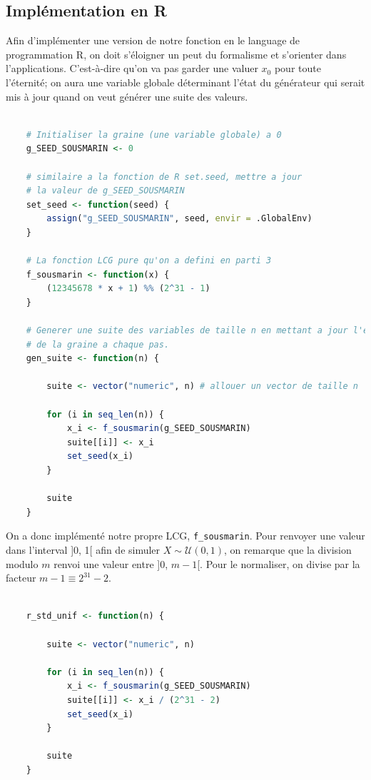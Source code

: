 \documentclass[10pt]{article} %
\begin{document}
\subsection{Implémentation en R}
Afin d'implémenter une version de notre fonction en le language de programmation R, on doit s'éloigner un peut du formalisme et s'orienter dans l'applications. C'est-à-dire qu'on va pas garder une valuer $x_0$
pour toute l'éternité; on aura une variable globale déterminant l'état du générateur qui serait mis à jour quand on veut générer une suite des valeurs.


\begin{lstlisting}[language =R]

    # Initialiser la graine (une variable globale) a 0
    g_SEED_SOUSMARIN <- 0

    # similaire a la fonction de R set.seed, mettre a jour
    # la valeur de g_SEED_SOUSMARIN
    set_seed <- function(seed) {
        assign("g_SEED_SOUSMARIN", seed, envir = .GlobalEnv)
    }

    # La fonction LCG pure qu'on a defini en parti 3
    f_sousmarin <- function(x) {
        (12345678 * x + 1) %% (2^31 - 1)
    }

    # Generer une suite des variables de taille n en mettant a jour l'etat
    # de la graine a chaque pas.
    gen_suite <- function(n) {

        suite <- vector("numeric", n) # allouer un vector de taille n

        for (i in seq_len(n)) {
            x_i <- f_sousmarin(g_SEED_SOUSMARIN)
            suite[[i]] <- x_i
            set_seed(x_i)
        }

        suite
    }
\end{lstlisting}

On a donc implémenté notre propre LCG, \texttt{f\_sousmarin}. Pour renvoyer une valeur dans l'interval ]0, 1[ afin de simuler $X \sim \mathcal{U}(0, 1)$, on remarque que
la division modulo $m$ renvoi une valeur entre ]0, $m - 1$[. Pour le normaliser, on divise par la facteur $m - 1 \equiv 2^{31} - 2$.

\begin{lstlisting}[language=R]

    r_std_unif <- function(n) {

        suite <- vector("numeric", n)

        for (i in seq_len(n)) {
            x_i <- f_sousmarin(g_SEED_SOUSMARIN)
            suite[[i]] <- x_i / (2^31 - 2)
            set_seed(x_i)
        }

        suite
    }

\end{lstlisting}
\end{document}
